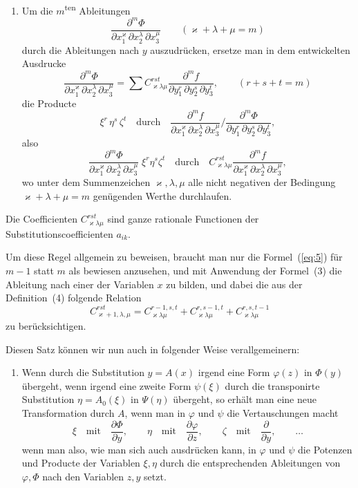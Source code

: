 \documentclass[12pt,a4paper]{article}
\theoremstyle{definition}
\begin{document}
\begin{enumerate}[label=\arabic*., resume]
\item Um die $m$\textsuperscript{ten} Ableitungen
\[
\frac{\partial^m \Phi}{\partial x_1^{\varkappa}\, \partial x_2^{\lambda}\, \partial x_3^{\mu}}
\qquad (\varkappa+\lambda+\mu=m)
\]
durch die Ableitungen nach $y$ auszudrücken, ersetze man in dem entwickelten Ausdrucke
\begin{equation}\label{eq:4}
\frac{\partial^m \Phi}{\partial x_1^{\varkappa}\, \partial x_2^{\lambda}\, \partial x_3^{\mu}}
= \sum C_{\varkappa\lambda\mu}^{rst}
\frac{\partial^m f}{\partial y_1^{r}\, \partial y_2^{s}\, \partial y_3^{t}},
\qquad (r+s+t=m)
\end{equation}
die Producte
\[
\xi^r\,\eta^s\,\zeta^t
\quad\text{durch}\quad
\frac{\partial^m f}{\partial x_1^{\varkappa}\, \partial x_2^{\lambda}\, \partial x_3^{\mu}}
\bigg/
\frac{\partial^m \Phi}{\partial y_1^{r}\, \partial y_2^{s}\, \partial y_3^{t}},
\]
also
\begin{equation}\label{eq:5}
\frac{\partial^m \Phi}{\partial x_1^{\varkappa}\, \partial x_2^{\lambda}\, \partial x_3^{\mu}}
\;\xi^r\eta^s\zeta^t
\quad\text{durch}\quad
C_{\varkappa\lambda\mu}^{rst}
\frac{\partial^m f}{\partial x_1^{\varkappa}\, \partial x_2^{\lambda}\, \partial x_3^{\mu}},
\end{equation}
wo unter dem Summenzeichen $\varkappa,\lambda,\mu$ alle nicht negativen der Bedingung $\varkappa+\lambda+\mu=m$ genügenden Werthe durchlaufen.
\end{enumerate}

Die Coefficienten $C_{\varkappa\lambda\mu}^{rst}$ sind ganze rationale Functionen der Substitutionscoefficienten $a_{ik}$.

Um diese Regel allgemein zu beweisen, braucht man nur die Formel~(\ref{eq:5}) für $m-1$ statt $m$ als bewiesen anzusehen, und mit Anwendung der Formel~(3) die Ableitung nach einer der Variablen $x$ zu bilden, und dabei die aus der Definition~(4) folgende Relation
\[
C_{\varkappa+1,\lambda,\mu}^{rst}
= C_{\varkappa\lambda\mu}^{r-1,s,t} + C_{\varkappa\lambda\mu}^{r,s-1,t} + C_{\varkappa\lambda\mu}^{r,s,t-1}
\]
zu berücksichtigen.

Diesen Satz können wir nun auch in folgender Weise verallgemeinern:

\begin{enumerate}[label=\arabic*., resume]
\item Wenn durch die Substitution $y = A(x)$ irgend eine Form $\varphi(z)$ in $\Phi(y)$ übergeht, wenn irgend eine zweite Form $\psi(\xi)$ durch die transponirte Substitution $\eta = A_0(\xi)$ in $\Psi(\eta)$ übergeht, so erhält man eine neue Transformation durch $A$, wenn man in $\varphi$ und $\psi$ die Vertauschungen macht
\[
\xi \quad\text{mit}\quad \frac{\partial\Phi}{\partial y},
\qquad
\eta \quad\text{mit}\quad \frac{\partial\varphi}{\partial z},
\qquad
\zeta \quad\text{mit}\quad \frac{\partial}{\partial y},
\qquad \dots
\]
wenn man also, wie man sich auch ausdrücken kann, in $\varphi$ und $\psi$ die Potenzen und Producte der Variablen $\xi,\eta$ durch die entsprechenden Ableitungen von $\varphi,\Phi$ nach den Variablen $z,y$ setzt.
\end{enumerate}
\end{document}
